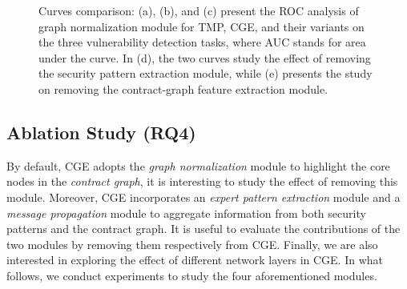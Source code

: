 \begin{figure*}
\centering 
{}
\caption{Curves comparison: (a), (b), and (c) present the ROC analysis of graph normalization module for TMP, CGE, and their variants on the three vulnerability detection tasks, where AUC stands for area under the curve. In (d), the two curves study the effect of removing the security pattern extraction module, while (e) presents the study on removing the contract-graph feature extraction module.}
\label{fig_roc}
\vspace{-1.8em}
\end{figure*} 

\vspace{-0.7em}
\subsection{Ablation Study (RQ4)}
By default, CGE adopts the \emph{graph normalization} module to highlight the core nodes in the \emph{contract graph},  it is interesting to study the effect of removing this module. Moreover, CGE incorporates an \emph{expert pattern extraction} module and a \emph{message propagation} module to aggregate information from both security patterns and the contract graph. It is useful to evaluate the contributions of the two modules by removing them respectively from CGE. Finally, we are also interested in exploring the effect of different network layers in CGE. In what follows, we conduct experiments to study the four aforementioned modules.

